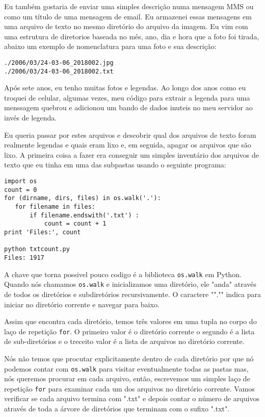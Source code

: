 \documentclass{book}
\begin{document}
Eu também gostaria de enviar uma simples descrição numa mensagem MMS ou como um título de uma mensagem de email. Eu armazenei essas mensagens em uma arquivo de texto no mesmo diretório do arquivo da imagem. Eu vim com uma estrutura de diretorios baseada no mês, ano, dia e hora que a foto foi tirada, abaixo um exemplo de nomenclatura para uma foto e sua descrição:

\begin{verbatim}
./2006/03/24-03-06_2018002.jpg
./2006/03/24-03-06_2018002.txt
\end{verbatim}
%

Após sete anos, eu tenho muitas fotos e legendas. Ao longo dos anos como eu troquei de celular, algumas vezes, meu código para extrair a legenda para uma menssagem quebrou e adicionou um bando de dados inuteis no meu servidor ao invés de legenda.


Eu queria passar por estes arquivos e descobrir qual dos arquivos de texto foram realmente legendas e quais eram lixo e, em seguida, apagar os arquivos que são lixo. A primeira coisa a fazer era conseguir um simples inventário dos arquivos de texto que eu tinha em uma das subpastas usando o seguinte programa:

\begin{verbatim}
import os
count = 0
for (dirname, dirs, files) in os.walk('.'):
   for filename in files:
       if filename.endswith('.txt') :
           count = count + 1
print 'Files:', count

python txtcount.py
Files: 1917
\end{verbatim}
%

A chave que torna possivel pouco codigo é a biblioteca {\tt os.walk} em Python. Quando nós chamamos
{\tt os.walk} e inicializamos uma diretório, ele "anda" através de todos os diretórios e subdiretórios recursivamente.
O caractere ""."" indica para iniciar no diretório corrente e navegar para baixo.

Assim que encontra cada diretório, temos três valores em uma tupla no corpo do laço de repetição {\tt for}.
O primeiro valor é o diretório corrente o segundo é a lista de sub-diretórios e o treceito valor é a lista de arquivos no diretório corrente.

Nós não temos que procutar explicitamente dentro de cada diretório por que nó podemos contar com {\tt os.walk} para visitar eventualmente todas as pastas mas, nós queremos procurar em cada arquivo, então, escrevemos um simples laço de repetição {\tt for} para examinar cada um dos arquivos no diretório corrente. Vamos verificar se cada arquivo termina com ".txt" e depois contar o número de arquivos através de toda a árvore de diretórios que terminam com o sufixo ".txt".
\end{document}
